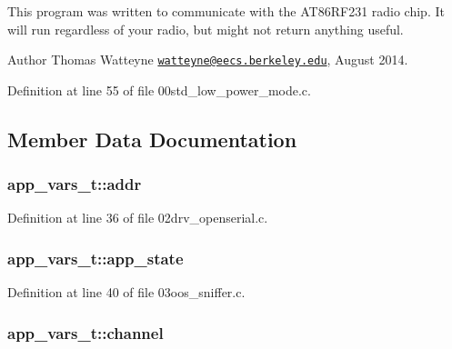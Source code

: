 This program was written to communicate with the A\+T86\+R\+F231 radio chip. It will run regardless of your radio, but might not return anything useful.

\begin{DoxyAuthor}{Author}
Thomas Watteyne \href{mailto:watteyne@eecs.berkeley.edu}{\tt watteyne@eecs.\+berkeley.\+edu}, August 2014. 
\end{DoxyAuthor}


Definition at line 55 of file 00std\+\_\+low\+\_\+power\+\_\+mode.\+c.



\subsection{Member Data Documentation}
\subsubsection[{\texorpdfstring{addr}{addr}}]{ app\+\_\+vars\+\_\+t\+::addr}\hypertarget{structapp__vars__t_a401332847afdfe64608f209712e75dcb}{}\label{structapp__vars__t_a401332847afdfe64608f209712e75dcb}


Definition at line 36 of file 02drv\+\_\+openserial.\+c.

\subsubsection[{\texorpdfstring{app\+\_\+state}{app_state}}]{ app\+\_\+vars\+\_\+t\+::app\+\_\+state}\hypertarget{structapp__vars__t_a64f792bb77df8660b230434b9babf08a}{}\label{structapp__vars__t_a64f792bb77df8660b230434b9babf08a}


Definition at line 40 of file 03oos\+\_\+sniffer.\+c.

\subsubsection[{\texorpdfstring{channel}{channel}}]{ app\+\_\+vars\+\_\+t\+::channel}\hypertarget{structapp__vars__t_a2cca4e0540bb7ae624c0ddb0033cff9d}{}\label{structapp__vars__t_a2cca4e0540bb7ae624c0ddb0033cff9d}


